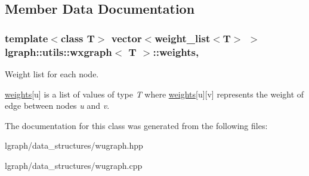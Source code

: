 \subsection{Member Data Documentation}
\hypertarget{classlgraph_1_1utils_1_1wxgraph_a15569c8c0fccb641709dc81eb0e29c94}{
\subsubsection[{weights}]{\setlength{\rightskip}{0pt plus 5cm}template$<$class T$>$ vector$<${\bf weight\-\_\-list}$<$T$>$ $>$ {\bf lgraph\-::utils\-::wxgraph}$<$ T $>$\-::weights\hspace{0.3cm}{\ttfamily [protected]}, {\ttfamily [inherited]}}}\label{classlgraph_1_1utils_1_1wxgraph_a15569c8c0fccb641709dc81eb0e29c94}


Weight list for each node. 

\hyperlink{classlgraph_1_1utils_1_1wxgraph_a15569c8c0fccb641709dc81eb0e29c94}{weights}\mbox{[}u\mbox{]} is a list of values of type {\itshape T} where \hyperlink{classlgraph_1_1utils_1_1wxgraph_a15569c8c0fccb641709dc81eb0e29c94}{weights}\mbox{[}u\mbox{]}\mbox{[}v\mbox{]} represents the weight of edge between nodes {\itshape u} and {\itshape v}. 

The documentation for this class was generated from the following files\-:\begin{DoxyCompactItemize}
\item 
lgraph/data\-\_\-structures/wugraph.\-hpp\item 
lgraph/data\-\_\-structures/wugraph.\-cpp\end{DoxyCompactItemize}
